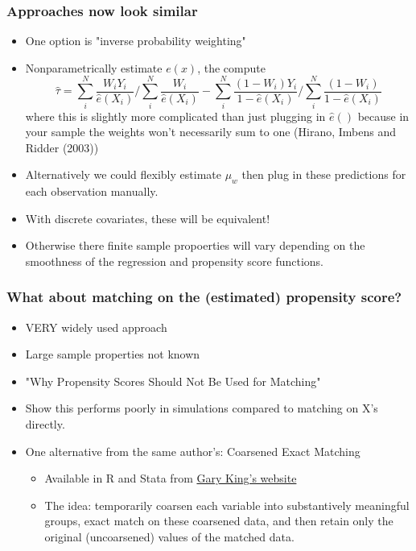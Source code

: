 \begin{frame}
  \frametitle{Approaches now look similar}
  \begin{itemize}
  \item One option is "inverse probability weighting" 
  \item Nonparametrically estimate $e(x)$, the compute 
  $$ \hat \tau = \sum_i^N \frac{W_i Y_i}{\hat e(X_i)} / \sum_i^N \frac{W_i}{\hat e(X_i)} - \sum_i^N \frac{(1-W_i) Y_i}{1 - \hat e(X_i)} / \sum_i^N \frac{(1-W_i)}{1 - \hat e(X_i)} $$ 
  where this is slightly more complicated than just plugging in $\hat e()$ because in your sample the weights won't necessarily sum to one (Hirano, Imbens and Ridder (2003))
  \item Alternatively we could flexibly estimate $\mu_w$ then plug in these predictions for each observation manually. 
  \item With discrete covariates, these will be equivalent! 
  \item Otherwise there finite sample propoerties will vary depending on the smoothness of the regression and propensity score functions. 
  \end{itemize}
\end{frame}

\begin{frame}
  \frametitle{What about matching on the (estimated) propensity score?}
  \begin{itemize}
  \item VERY widely used approach 
  \item Large sample properties not known 
  \item "Why Propensity Scores Should Not Be Used for Matching" \citep{KingNielsonPSM}
  \item Show this performs poorly in simulations compared to matching on X's directly. 
  \item One alternative from the same author's: Coarsened Exact Matching
  \begin{itemize}
    \item Available in R and Stata from \href{https://gking.harvard.edu/cem}{Gary King's website}
    \item The idea: temporarily coarsen each variable into substantively meaningful groups, exact match on these coarsened data, and then retain only the original (uncoarsened) values of the matched data.
  \end{itemize}
  \end{itemize}
\end{frame}
  
